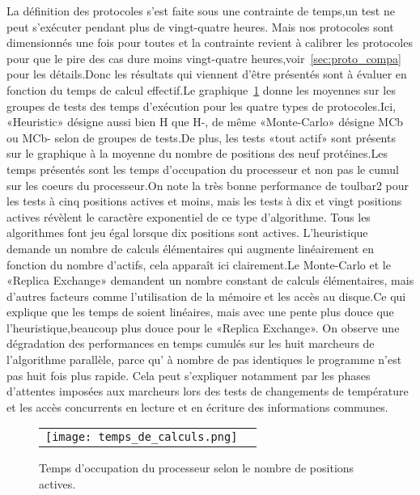 La définition des protocoles s'est faite sous une contrainte de temps,un test ne peut s'exécuter pendant plus de vingt-quatre heures. Mais nos protocoles sont dimensionnés une fois pour toutes et la contrainte revient à calibrer les protocoles pour que le pire des cas dure moins vingt-quatre heures,voir~\ref{sec:proto_compa} pour les détails.Donc les résultats qui viennent d'être présentés sont à évaluer en fonction du temps de calcul effectif.Le graphique~\ref{graph:temps_CPU} donne les moyennes sur les groupes de tests des temps d'exécution pour les quatre types de protocoles.Ici, «Heuristic» désigne aussi bien H que H-, de même «Monte-Carlo» désigne MCb ou MCb- selon de groupes de tests.De plus, les tests «tout actif» sont présents sur le graphique à la moyenne du nombre de positions des neuf protéines.Les temps présentés sont les temps d'occupation du processeur et non pas le cumul sur les coeurs du processeur.On note la très bonne performance de toulbar2 pour les tests à cinq positions actives et moins, mais les tests à dix et vingt positions actives révèlent le caractère exponentiel de ce type d'algorithme. Tous les algorithmes font jeu égal lorsque dix positions sont actives. L'heuristique demande un nombre de calculs élémentaires qui augmente linéairement en fonction du nombre d'actifs, cela apparaît ici clairement.Le Monte-Carlo et le «Replica Exchange» demandent un nombre constant de calculs élémentaires, mais d'autres facteurs comme l'utilisation de la mémoire et les accès au disque.Ce qui explique que les temps de soient linéaires, mais avec une pente plus douce que l'heuristique,beaucoup plus douce pour le «Replica Exchange». On observe une dégradation des performances en temps cumulés sur les huit marcheurs de l'algorithme parallèle, parce qu’ à nombre de pas identiques le programme n'est pas huit fois plus rapide. Cela peut s'expliquer notamment par les phases d'attentes imposées aux marcheurs lors des tests de changements de température et les accès concurrents en lecture et en écriture des informations communes.      

    
    \begin{figure}[h]
      \centering
      \begin{tabular}{cc}
        \texttt{[image: temps\_de\_calculs.png]} &
      \end{tabular}
      
      \caption{Temps d'occupation du processeur selon le nombre de positions actives.}
\label{graph:temps_CPU}
    \end{figure}


